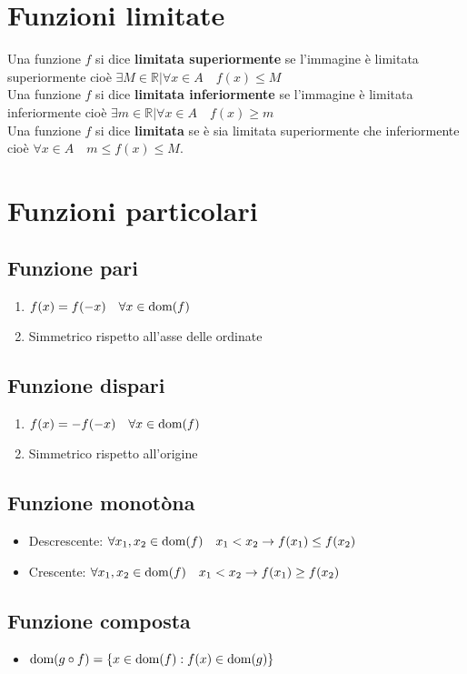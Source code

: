 \documentclass[12pt, a4paper]{report}
\begin{document}
    \section{Funzioni limitate}
    Una funzione $f$ si dice \textbf{limitata superiormente} se l'immagine è limitata superiormente cioè $\exists M \in \mathbb{R} | \forall x \in A \quad f(x)\leq M$\\
    Una funzione $f$ si dice \textbf{limitata inferiormente} se l'immagine è limitata inferiormente cioè $\exists m \in \mathbb{R} | \forall x \in A \quad f(x)\geq m$\\
    Una funzione $f$ si dice \textbf{limitata} se è sia limitata superiormente che inferiormente cioè $\forall x \in A \quad m\leq f(x)\leq M$.
    \section{Funzioni particolari}
    \subsection{Funzione pari}
    \begin{enumerate}
        \item $f(x)=f(-x) \quad \forall x \in \text{dom}(f)$
        \item Simmetrico rispetto all'asse delle ordinate
    \end{enumerate}
    \subsection{Funzione dispari}
    \begin{enumerate}
        \item $f(x)=-f(-x) \quad \forall x \in \text{dom}(f)$
        \item Simmetrico rispetto all'origine
    \end{enumerate}
    \subsection{Funzione monotòna}
    \begin{itemize}
        \item Descrescente: $\forall x_{1},x_{2} \in \text{dom}(f) \quad x_{1}<x_{2}\rightarrow f(x_{1})\leq f(x_{2})$
        \item Crescente: $\forall x_{1},x_{2} \in \text{dom}(f) \quad x_{1}<x_{2}\rightarrow f(x_{1})\geq f(x_{2})$
    \end{itemize}
    \subsection{Funzione composta}
    \begin{itemize}
        \item $\text{dom}(g\circ f)=\{x\in\text{dom}(f):f(x)\in \text{dom}(g)\}$ 
    \end{itemize}
\end{document}
